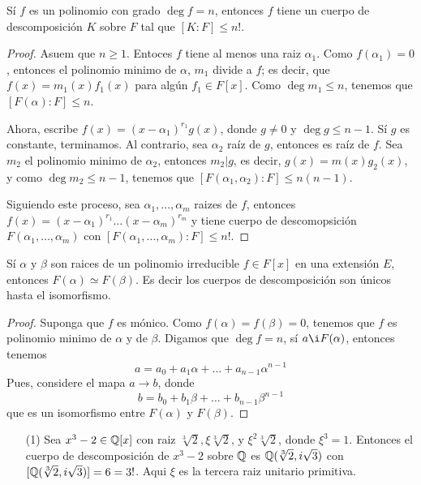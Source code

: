 \begin{lemma}\label{lemma_84}
    S\'i $f$ es un polinomio con grado  $\deg{f}=n$, entonces $f$ tiene un
    cuerpo de descomposici\'on  $K$ sobre  $F$ tal que  $[K:F] \leq n!$.
\end{lemma}
\begin{proof}
    Asuem que $n \geq 1$. Entoces  $f$ tiene al menos una raiz  $\alpha_1$. Como
    $f(\alpha_1)=0$, entonces el polinomio minimo de $\alpha$,  $m_1$ divide a
    $f$; es decir, que $f(x)=m_1(x)f_1(x)$ para alg\'un $f_1 \in F[x]$. Como
    $\deg{m_1} \leq n$, tenemos que $[F(\alpha):F] \leq n$.

    Ahora, escribe $f(x)=(x-\alpha_1)^{r_1}g(x)$, donde $g \neq 0$ y  $\deg{g}
    \leq n-1$. S\'i $g$ es constante, terminamos. Al contrario, sea  $\alpha_2$
    ra\'iz de $g$, entonces es ra\'iz de  $f$. Sea  $m_2$ el polinomio minimo de
    $\alpha_2$, entonces $m_2|g$, es decir, $g(x)=m(x)g_2(x)$, y como $\deg{m_2}
    \leq n-1$, tenemos que $[F(\alpha_1,\alpha_2):F] \leq n(n-1)$.

    Siguiendo este proceso, sea $\alpha_1, \dots, \alpha_m$ raizes de $f$,
    entonces $f(x)=(x-\alpha_1)^{r_1} \dots (x-\alpha_m)^{r_m}$ y tiene cuerpo
    de descomopsici\'on $F(\alpha_1, \dots, \alpha_m)$ con $[F(\alpha_1, \dots,
    \alpha_m) : F] \leq n!$.
\end{proof}

\begin{theorem}\label{theorem_85}
    S\'i $\alpha$ y  $\beta$ son raices de un polinomio irreducible $f \in
    F[x]$ en una extensi\'on $E$, entonces  $F(\alpha) \simeq F(\beta)$. Es
    decir los cuerpos de descomposici\'on son \'unicos hasta el isomorfismo.
\end{theorem}
\begin{proof}
    Suponga que $f$ es m\'onico. Como  $f(\alpha)=f(\beta)=0$, tenemos que $f$
    es polinomio minimo de  $\alpha$ y de  $\beta$. Digamos que  $\deg{f}=n$,
    s\'i $a \i F(\alpha)$, entonces tenemos
    \begin{equation*}
        a=a_0+a_1\alpha+\dots+a_{n-1}\alpha^{n-1}
    \end{equation*}
    Pues, considere el mapa $a \xrightarrow{} b$, donde
    \begin{equation*}
        b=b_0+b_1\beta+\dots+b_{n-1}\beta^{n-1}
    \end{equation*}
    que es un isomorfismo entre $F(\alpha)$ y $F(\beta)$.
\end{proof}

\begin{example}\label{}
    \begin{enumerate}
        \item[(1)] Sea $x^3-2 \in \mathbb{Q}[x]$ con raiz $\sqrt[3]{2},
            \xi\sqrt[3]{2}$, y $\xi^2\sqrt[3]{2}$, donde  $\xi^3=1$. Entonces el
            cuerpo de descomposici\'on de $x^3-2$ sobre $\mathbb{Q}$ es
            $\mathbb{Q}(\sqrt[3]{2}, i\sqrt{3})$ con $[\mathbb{Q}(\sqrt[3]{2}, i\sqrt{3})]=6=3!$.
            Aqui $\xi$ es la tercera raiz unitario primitiva.
    \end{enumerate}
\end{example}
